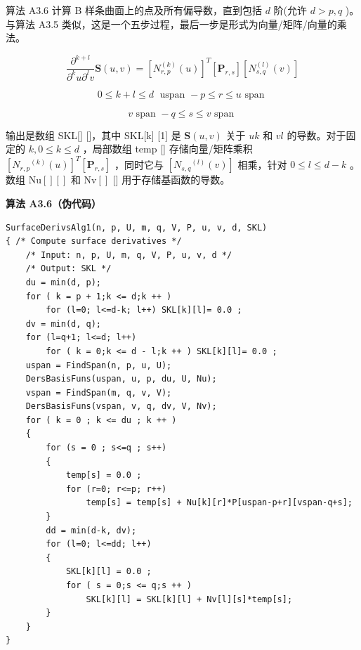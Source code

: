 \documentclass[../main.tex]{subfiles}
\begin{document}
算法 A3.6 计算 B 样条曲面上的点及所有偏导数，直到包括 \(d\) 阶(允许 \(d > p,q\) )。与算法 A3.5 类似，这是一个五步过程，最后一步是形式为向量/矩阵/向量的乘法。

\[
\frac{{\partial }^{k + l}}{{\partial }^{k}u{\partial }^{l}v}\mathbf{S}\left( {u,v}\right)  = {\left\lbrack  {N}_{r,p}^{\left( k\right) }\left( u\right) \right\rbrack  }^{T}\left\lbrack  {\mathbf{P}}_{r,s}\right\rbrack  \left\lbrack  {{N}_{s,q}^{\left( l\right) }\left( v\right) }\right\rbrack
\]

\[
0 \leq  k + l \leq  d\;\text{ uspan } - p \leq  r \leq  u\text{ span }
\]

\[
v\text{ span } - q \leq  s \leq  v\text{ span } \tag{3.18}
\]

输出是数组 SKL[] []，其中 SKL[k] [1] 是 \(\mathbf{S}\left( {u,v}\right)\) 关于 \({uk}\) 和 \({vl}\) 的导数。对于固定的 \(k,0 \leq  k \leq  d\) ，局部数组 temp [] 存储向量/矩阵乘积 \({\left\lbrack  {N}_{r,p}{}^{\left( k\right) }\left( u\right) \right\rbrack  }^{T}\left\lbrack  {\mathbf{P}}_{r,s}\right\rbrack\) ，同时它与 \(\left\lbrack  {{N}_{s,q}{}^{\left( l\right) }\left( v\right) }\right\rbrack\) 相乘，针对 \(0 \leq  l \leq  d - k\) 。数组 \(\mathrm{{Nu}}\left\lbrack  \right\rbrack  \left\lbrack  \right\rbrack\) 和 \(\mathrm{{Nv}}\left\lbrack  \right\rbrack\) [] 用于存储基函数的导数。

\par\medskip\noindent\textbf{算法 A3.6（伪代码）}\par
\begin{verbatim}
SurfaceDerivsAlg1(n, p, U, m, q, V, P, u, v, d, SKL)
{ /* Compute surface derivatives */
    /* Input: n, p, U, m, q, V, P, u, v, d */
    /* Output: SKL */
    du = min(d, p);
    for ( k = p + 1;k <= d;k ++ )
        for (l=0; l<=d-k; l++) SKL[k][l]= 0.0 ;
    dv = min(d, q);
    for (l=q+1; l<=d; l++)
        for ( k = 0;k <= d - l;k ++ ) SKL[k][l]= 0.0 ;
    uspan = FindSpan(n, p, u, U);
    DersBasisFuns(uspan, u, p, du, U, Nu);
    vspan = FindSpan(m, q, v, V);
    DersBasisFuns(vspan, v, q, dv, V, Nv);
    for ( k = 0 ; k <= du ; k ++ )
    {
        for (s = 0 ; s<=q ; s++)
        {
            temp[s] = 0.0 ;
            for (r=0; r<=p; r++)
                temp[s] = temp[s] + Nu[k][r]*P[uspan-p+r][vspan-q+s];
        }
        dd = min(d-k, dv);
        for (l=0; l<=dd; l++)
        {
            SKL[k][l] = 0.0 ;
            for ( s = 0;s <= q;s ++ )
                SKL[k][l] = SKL[k][l] + Nv[l][s]*temp[s];
        }
    }
}
\end{verbatim}
\end{document}
